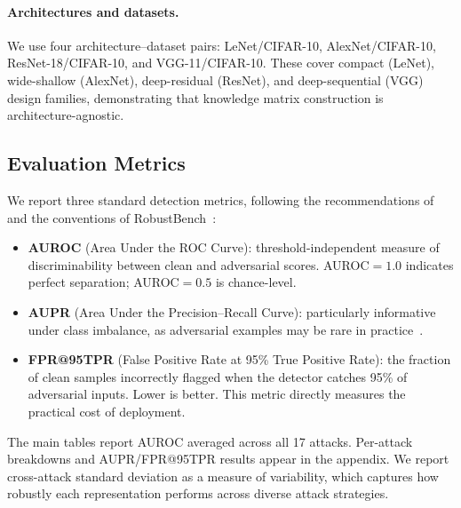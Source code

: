 \paragraph{Architectures and datasets.}
We use four architecture--dataset pairs: LeNet/CIFAR-10, AlexNet/CIFAR-10, ResNet-18/CIFAR-10, and VGG-11/CIFAR-10.
These cover compact (LeNet), wide-shallow (AlexNet), deep-residual (ResNet), and deep-sequential (VGG) design families, demonstrating that knowledge matrix construction is architecture-agnostic.


\subsection{Evaluation Metrics}
\label{sec:metrics}

We report three standard detection metrics, following the recommendations of \citet{carlini2019evaluating} and the conventions of RobustBench~\citep{croce2021robustbench}:

\begin{itemize}
    \item \textbf{AUROC} (Area Under the ROC Curve): threshold-independent measure of discriminability between clean and adversarial scores.
    AUROC${}=1.0$ indicates perfect separation; AUROC${}=0.5$ is chance-level.

    \item \textbf{AUPR} (Area Under the Precision--Recall Curve): particularly informative under class imbalance, as adversarial examples may be rare in practice~\citep{saito2015precision}.

    \item \textbf{FPR@95TPR} (False Positive Rate at 95\% True Positive Rate): the fraction of clean samples incorrectly flagged when the detector catches 95\% of adversarial inputs.
    Lower is better.
    This metric directly measures the practical cost of deployment.
\end{itemize}

The main tables report AUROC averaged across all 17 attacks.
Per-attack breakdowns and AUPR/FPR@95TPR results appear in the appendix.
We report cross-attack standard deviation as a measure of variability, which captures how robustly each representation performs across diverse attack strategies.


